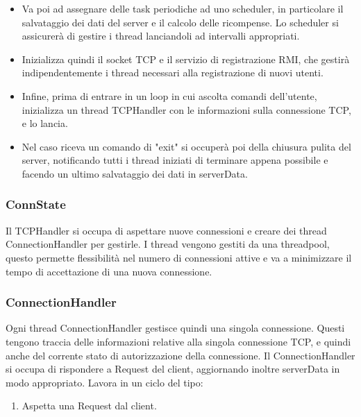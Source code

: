 \documentclass[11pt]{article}
\begin{document}
\begin{flushleft}
\begin{itemize}
\item
Va poi ad assegnare delle task periodiche ad uno scheduler, in particolare il salvataggio dei dati del server e il calcolo delle ricompense. Lo scheduler si assicurerà di gestire i thread lanciandoli ad intervalli appropriati.

\item
Inizializza quindi il socket TCP e il servizio di registrazione RMI, che gestirà indipendentemente i thread necessari alla registrazione di nuovi utenti.

\item
Infine, prima di entrare in un loop in cui ascolta comandi dell'utente, inizializza un thread TCPHandler con le informazioni sulla connessione TCP, e lo lancia.

\item
Nel caso riceva un comando di "exit" si occuperà poi della chiusura pulita del server, notificando tutti i thread iniziati di terminare appena possibile e facendo un ultimo salvataggio dei dati in serverData.


\end{itemize}

\subsubsection{ConnState}

Il TCPHandler si occupa di aspettare nuove connessioni e creare dei thread ConnectionHandler per gestirle. I thread vengono gestiti da una threadpool, questo permette flessibilità nel numero di connessioni attive e va a minimizzare il tempo di accettazione di una nuova connessione.

\subsubsection{ConnectionHandler}

Ogni thread ConnectionHandler gestisce quindi una singola connessione.
Questi tengono traccia delle informazioni relative alla singola connessione TCP, e quindi anche del corrente stato di autorizzazione della connessione. Il ConnectionHandler si occupa di rispondere a Request del client, aggiornando inoltre serverData in modo appropriato.
Lavora in un ciclo del tipo:

\begin{enumerate}

\item Aspetta una Request dal client.


\end{enumerate}
\end{flushleft}
\end{document}
